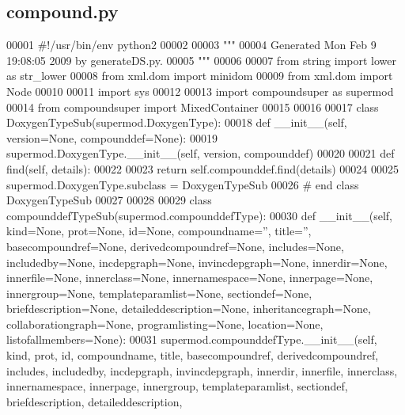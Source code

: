 \subsection{compound.\+py}
\label{compound_8py_source}

\begin{DoxyCode}
00001 \textcolor{comment}{#!/usr/bin/env python2}
00002 
00003 \textcolor{stringliteral}{"""}
00004 \textcolor{stringliteral}{Generated Mon Feb  9 19:08:05 2009 by generateDS.py.}
00005 \textcolor{stringliteral}{"""}
00006 
00007 \textcolor{keyword}{from} string \textcolor{keyword}{import} lower \textcolor{keyword}{as} str\_lower
00008 \textcolor{keyword}{from} xml.dom \textcolor{keyword}{import} minidom
00009 \textcolor{keyword}{from} xml.dom \textcolor{keyword}{import} Node
00010 
00011 \textcolor{keyword}{import} sys
00012 
00013 \textcolor{keyword}{import} compoundsuper \textcolor{keyword}{as} supermod
00014 \textcolor{keyword}{from} compoundsuper \textcolor{keyword}{import} MixedContainer
00015 
00016 
00017 \textcolor{keyword}{class }DoxygenTypeSub(supermod.DoxygenType):
00018     \textcolor{keyword}{def }__init__(self, version=None, compounddef=None):
00019         supermod.DoxygenType.\_\_init\_\_(self, version, compounddef)
00020 
00021     \textcolor{keyword}{def }find(self, details):
00022 
00023         \textcolor{keywordflow}{return} self.compounddef.find(details)
00024 
00025 supermod.DoxygenType.subclass = DoxygenTypeSub
00026 \textcolor{comment}{# end class DoxygenTypeSub}
00027 
00028 
00029 \textcolor{keyword}{class }compounddefTypeSub(supermod.compounddefType):
00030     \textcolor{keyword}{def }__init__(self, kind=None, prot=None, id=None, compoundname='', title='', basecompoundref=None, 
      derivedcompoundref=None, includes=None, includedby=None, incdepgraph=None, invincdepgraph=None, innerdir=None, 
      innerfile=None, innerclass=None, innernamespace=None, innerpage=None, innergroup=None, 
      templateparamlist=None, sectiondef=None, briefdescription=None, detaileddescription=None, inheritancegraph=None, 
      collaborationgraph=None, programlisting=None, location=None, listofallmembers=None):
00031         supermod.compounddefType.\_\_init\_\_(self, kind, prot, id, compoundname, title, basecompoundref, 
      derivedcompoundref, includes, includedby, incdepgraph, invincdepgraph, innerdir, innerfile, innerclass, 
      innernamespace, innerpage, innergroup, templateparamlist, sectiondef, briefdescription, detaileddescription, 

\end{DoxyCode}
